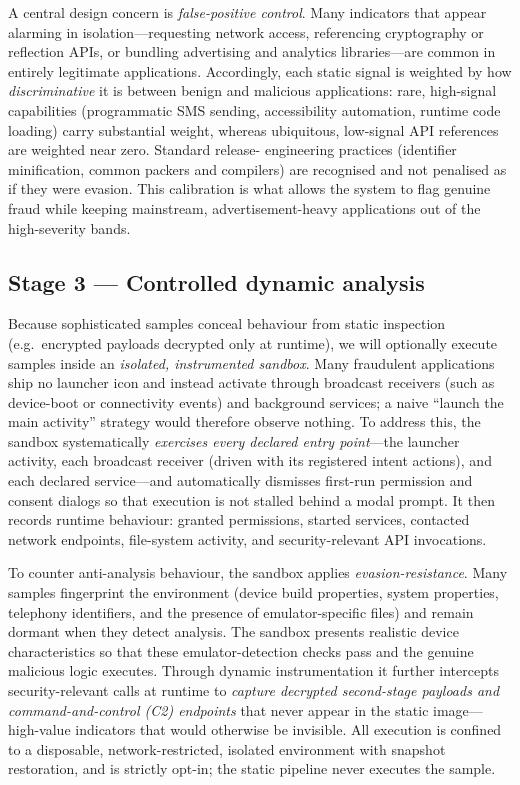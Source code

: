 \documentclass[11pt,a4paper]{article}
\begin{document}
A central design concern is \emph{false-positive control}. Many indicators that appear
alarming in isolation---requesting network access, referencing cryptography or reflection
APIs, or bundling advertising and analytics libraries---are common in entirely legitimate
applications. Accordingly, each static signal is weighted by how \emph{discriminative} it
is between benign and malicious applications: rare, high-signal capabilities (programmatic
SMS sending, accessibility automation, runtime code loading) carry substantial weight,
whereas ubiquitous, low-signal API references are weighted near zero. Standard release-
engineering practices (identifier minification, common packers and compilers) are
recognised and not penalised as if they were evasion. This calibration is what allows the
system to flag genuine fraud while keeping mainstream, advertisement-heavy applications
out of the high-severity bands.

\subsection{Stage 3 --- Controlled dynamic analysis}
Because sophisticated samples conceal behaviour from static inspection (e.g.\ encrypted
payloads decrypted only at runtime), we will optionally execute samples inside an
\emph{isolated, instrumented sandbox}. Many fraudulent applications ship no launcher
icon and instead activate through broadcast receivers (such as device-boot or
connectivity events) and background services; a naive ``launch the main activity''
strategy would therefore observe nothing. To address this, the sandbox systematically
\emph{exercises every declared entry point}---the launcher activity, each broadcast
receiver (driven with its registered intent actions), and each declared service---and
automatically dismisses first-run permission and consent dialogs so that execution is not
stalled behind a modal prompt. It then records runtime behaviour: granted permissions,
started services, contacted network endpoints, file-system activity, and
security-relevant API invocations.

To counter anti-analysis behaviour, the sandbox applies \emph{evasion-resistance}. Many
samples fingerprint the environment (device build properties, system properties,
telephony identifiers, and the presence of emulator-specific files) and remain dormant
when they detect analysis. The sandbox presents realistic device characteristics so that
these emulator-detection checks pass and the genuine malicious logic executes. Through
dynamic instrumentation it further intercepts security-relevant calls at runtime to
\emph{capture decrypted second-stage payloads and command-and-control (C2) endpoints}
that never appear in the static image---high-value indicators that would otherwise be
invisible. All execution is confined to a disposable, network-restricted, isolated
environment with snapshot restoration, and is strictly opt-in; the static pipeline never
executes the sample.
\end{document}
